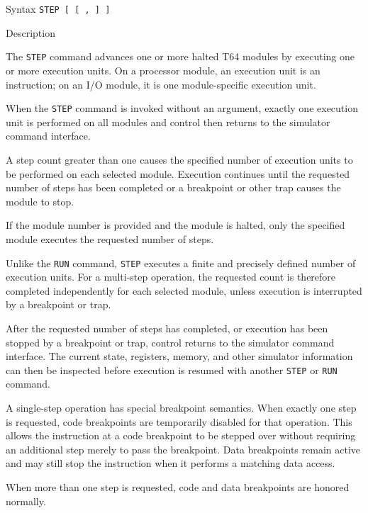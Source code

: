 %
%
\pagebreak
{}

\begin{iPageDescEntry}{Syntax}
\texttt{STEP [  [ ,  ] ]} \
\end{iPageDescEntry}

\begin{iPageDescEntry}{Description}

The \texttt{STEP} command advances one or more halted T64 modules by executing
one or more execution units. On a processor module, an execution unit is an
instruction; on an I/O module, it is one module-specific execution unit.

When the \texttt{STEP} command is invoked without an argument, exactly one
execution unit is performed on all modules and control then returns to the
simulator command interface.

A step count greater than one causes the specified number of execution units
to be performed on each selected module. Execution continues until the
requested number of steps has been completed or a breakpoint or other trap
causes the module to stop.

If the module number is provided and the module is halted, only the specified
module executes the requested number of steps.

Unlike the \texttt{RUN} command, \texttt{STEP} executes a finite and precisely
defined number of execution units. For a multi-step operation, the requested
count is therefore completed independently for each selected module, unless
execution is interrupted by a breakpoint or trap.

After the requested number of steps has completed, or execution has been
stopped by a breakpoint or trap, control returns to the simulator command
interface. The current state, registers, memory, and other simulator
information can then be inspected before execution is resumed with another
\texttt{STEP} or \texttt{RUN} command.

A single-step operation has special breakpoint semantics. When exactly one
step is requested, code breakpoints are temporarily disabled for that
operation. This allows the instruction at a code breakpoint to be stepped
over without requiring an additional step merely to pass the breakpoint.
Data breakpoints remain active and may still stop the instruction when it
performs a matching data access.

When more than one step is requested, code and data breakpoints are honored
normally.

\end{iPageDescEntry}

